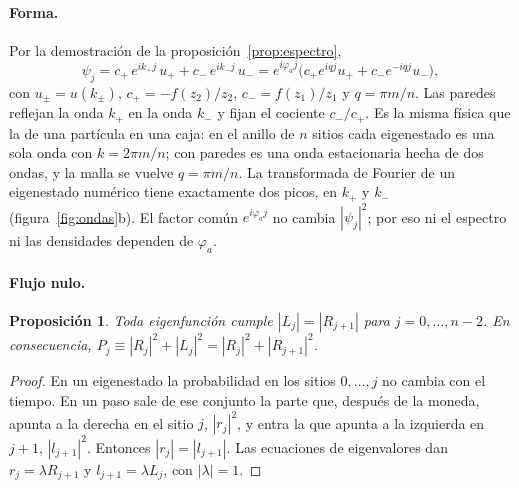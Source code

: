 \documentclass[11pt,a4paper]{article}
\newtheorem{proposicion}{Proposición}
\theoremstyle{remark}
\begin{document}
\paragraph{Forma.} Por la demostración de la proposición~\ref{prop:espectro},
\begin{equation}
\psi_j=c_+\,e^{ik_+j}\,u_+ + c_-\,e^{ik_-j}\,u_-
=e^{i\varphi_a j}\bigl(c_+e^{iqj}u_+ + c_-e^{-iqj}u_-\bigr),
\label{eq:psibanda}
\end{equation}
con $u_\pm=u(k_\pm)$, $c_+=-f(z_2)/z_2$, $c_-=f(z_1)/z_1$ y
$q=\pi m/n$. Las paredes reflejan la onda $k_+$ en la onda $k_-$ y fijan el
cociente $c_-/c_+$. Es la misma física que la de una partícula en una caja:
en el anillo de $n$ sitios cada eigenestado es una sola onda con
$k=2\pi m/n$; con paredes es una onda estacionaria hecha de dos ondas, y la
malla se vuelve $q=\pi m/n$. La transformada de Fourier de un eigenestado
numérico tiene exactamente dos picos, en $k_+$ y $k_-$
(figura~\ref{fig:ondas}b). El factor común $e^{i\varphi_a j}$ no cambia
$|\psi_j|^2$; por eso ni el espectro ni las densidades dependen de $\varphi_a$.

\paragraph{Flujo nulo.}
\begin{proposicion}\label{prop:flujo}
Toda eigenfunción cumple $|L_j|=|R_{j+1}|$ para $j=0,\dots,n-2$. En
consecuencia, $P_j\equiv|R_j|^2+|L_j|^2=|R_j|^2+|R_{j+1}|^2$.
\end{proposicion}
\begin{proof}
En un eigenestado la probabilidad en los sitios $0,\dots,j$ no cambia con el
tiempo. En un paso sale de ese conjunto la parte que, después de la moneda,
apunta a la derecha en el sitio $j$, $|r_j|^2$, y entra la que apunta a la
izquierda en $j+1$, $|l_{j+1}|^2$. Entonces $|r_j|=|l_{j+1}|$. Las ecuaciones de
eigenvalores dan $r_j=\lambda R_{j+1}$ y $l_{j+1}=\lambda L_j$, con $|\lambda|=1$.
\end{proof}
\end{document}

